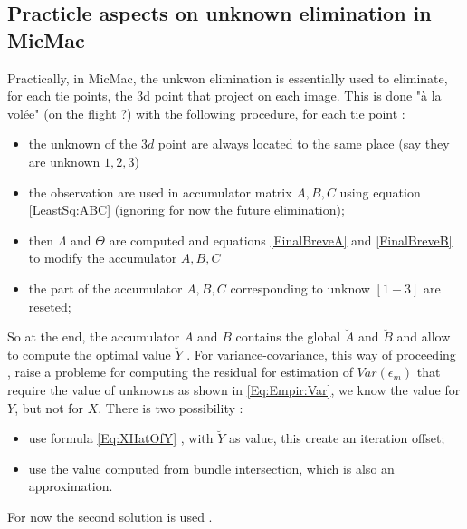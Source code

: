 \subsection{Practicle aspects on unknown elimination in MicMac}

Practically, in MicMac, the unkwon elimination is essentially used  to eliminate, for each tie points, 
the $3$d point that project on each image. This is done "\`a la vol\'ee" (on the flight ?) with
the following procedure, for each tie point :

\begin{itemize}
    \item the unknown of the $3d$ point are always located to the same place (say they are unknown $1,2,3$)
    \item the observation are used in accumulator matrix $A,B,C$ using equation \ref{LeastSq:ABC} (ignoring
          for now the future elimination);
    \item  then $\Lambda$ and $\Theta$ are computed and equations \ref{FinalBreveA} and \ref{FinalBreveB} to
           modify the accumulator $A,B,C$
    \item the part of the accumulator $A,B,C$  corresponding to unknow $[1-3]$ are reseted;
\end{itemize}

So at the end, the accumulator $A$ and $B$ contains the  global $\breve A$  and $\breve B$ and allow to
compute the optimal value $\breve Y$ . For variance-covariance,
this way of proceeding ,  raise a probleme for computing the residual for estimation of $Var(\epsilon _m)$  that
require the value of unknowns as shown in \ref{Eq:Empir:Var}, we know the value for $Y$, but not for $X$.
There is two possibility :

\begin{itemize}
   \item  use  formula \ref{Eq:XHatOfY} , with  $\breve Y$  as value, this create an iteration offset;
   \item use the value computed from bundle intersection, which is also an approximation.
\end{itemize}

For now the second solution is used .




